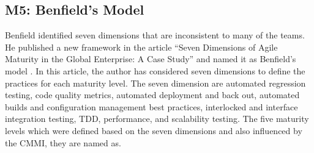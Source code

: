 \documentclass[a4paper,oneside]{bth}
\begin{document}
\subsection{M5: Benfield's Model}
Benfield identified seven dimensions that are inconsistent to many of the teams. He published a new framework in the article “Seven Dimensions of Agile Maturity in the Global Enterprise: A Case Study” and named it as Benfield’s model \cite{benefield_seven_2010}. In this article, the author has considered seven dimensions to define the practices for each maturity level. The seven dimension are automated regression testing, code quality metrics, automated deployment and back out, automated builds and configuration management best practices, interlocked and interface integration testing, TDD, performance, and scalability testing. The five maturity levels which were defined based on the seven dimensions and also influenced by the CMMI, they are named as.
\end{document}
